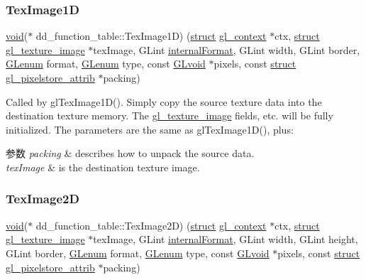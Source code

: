 \subsubsection{\texorpdfstring{Tex\+Image1D}{TexImage1D}}
{\footnotesize\ttfamily \hyperlink{interfacevoid}{void}($\ast$ dd\+\_\+function\+\_\+table\+::\+Tex\+Image1D) (\hyperlink{interfacestruct}{struct} \hyperlink{structgl__context}{gl\+\_\+context} $\ast$ctx, \hyperlink{interfacestruct}{struct} \hyperlink{structgl__texture__image}{gl\+\_\+texture\+\_\+image} $\ast$tex\+Image, G\+Lint \hyperlink{interfacevoid}{internal\+Format}, G\+Lint width, G\+Lint border, \hyperlink{interfacevoid}{G\+Lenum} format, \hyperlink{interfacevoid}{G\+Lenum} type, const \hyperlink{interfacevoid}{G\+Lvoid} $\ast$pixels, const \hyperlink{interfacestruct}{struct} \hyperlink{structgl__pixelstore__attrib}{gl\+\_\+pixelstore\+\_\+attrib} $\ast$packing)}

Called by gl\+Tex\+Image1\+D(). Simply copy the source texture data into the destination texture memory. The \hyperlink{structgl__texture__image}{gl\+\_\+texture\+\_\+image} fields, etc. will be fully initialized. The parameters are the same as gl\+Tex\+Image1\+D(), plus\+: 
\begin{DoxyParams}{参数}
{\em packing} & describes how to unpack the source data. \\
\hline
{\em tex\+Image} & is the destination texture image. \\
\hline
\end{DoxyParams}
\mbox{\label{structdd__function__table_a2640ee0c4221b29d2f01603424cd3b3a}} 
\subsubsection{\texorpdfstring{Tex\+Image2D}{TexImage2D}}
{\footnotesize\ttfamily \hyperlink{interfacevoid}{void}($\ast$ dd\+\_\+function\+\_\+table\+::\+Tex\+Image2D) (\hyperlink{interfacestruct}{struct} \hyperlink{structgl__context}{gl\+\_\+context} $\ast$ctx, \hyperlink{interfacestruct}{struct} \hyperlink{structgl__texture__image}{gl\+\_\+texture\+\_\+image} $\ast$tex\+Image, G\+Lint \hyperlink{interfacevoid}{internal\+Format}, G\+Lint width, G\+Lint height, G\+Lint border, \hyperlink{interfacevoid}{G\+Lenum} format, \hyperlink{interfacevoid}{G\+Lenum} type, const \hyperlink{interfacevoid}{G\+Lvoid} $\ast$pixels, const \hyperlink{interfacestruct}{struct} \hyperlink{structgl__pixelstore__attrib}{gl\+\_\+pixelstore\+\_\+attrib} $\ast$packing)}

